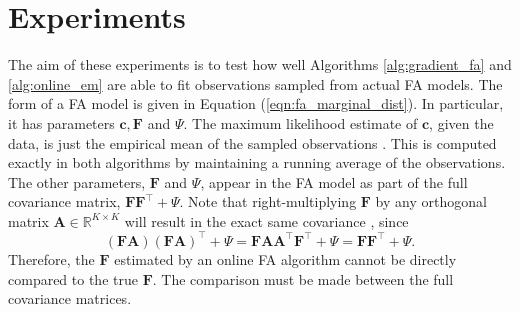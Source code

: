 \documentclass[msc,deptreport.inf]{infthesis} %
\newcommand{\matr}[1]{\mathbf{#1}}
\newcommand{\R}{\mathbb R}
\begin{document}
\section{Experiments}\label{ch:online_fa_experiments}


The aim of these experiments is to test how well Algorithms \ref{alg:gradient_fa} and \ref{alg:online_em} are able to fit observations sampled from actual FA models. The form of a FA model is given in Equation (\ref{eqn:fa_marginal_dist}). In particular, it has parameters $\matr{c}, \matr{F}$ and $\Psi$. The maximum likelihood estimate of $\matr{c}$, given the data, is just the empirical mean of the sampled observations \cite{barber2007}. This is computed exactly in both algorithms by maintaining a running average of the observations. The other parameters, $\matr{F}$ and $\Psi$, appear in the FA model as part of the full covariance matrix,  $\matr{F}\matr{F}^\intercal + \Psi$. Note that right-multiplying $\matr{F}$ by any orthogonal matrix $\matr{A} \in \R^{K \times K}$ will result in the exact same covariance \cite{barber2007}, since
\begin{equation}
	(\matr{F} \matr{A}) (\matr{F} \matr{A})^\intercal + \Psi
	= \matr{F} \matr{A} \matr{A}^\intercal \matr{F}^\intercal + \Psi
	= \matr{F} \matr{F}^\intercal + \Psi.
\end{equation}
Therefore, the $\matr{F}$ estimated by an online FA algorithm cannot be directly compared to the true $\matr{F}$. The comparison must be made between the full covariance matrices.  
\end{document}
